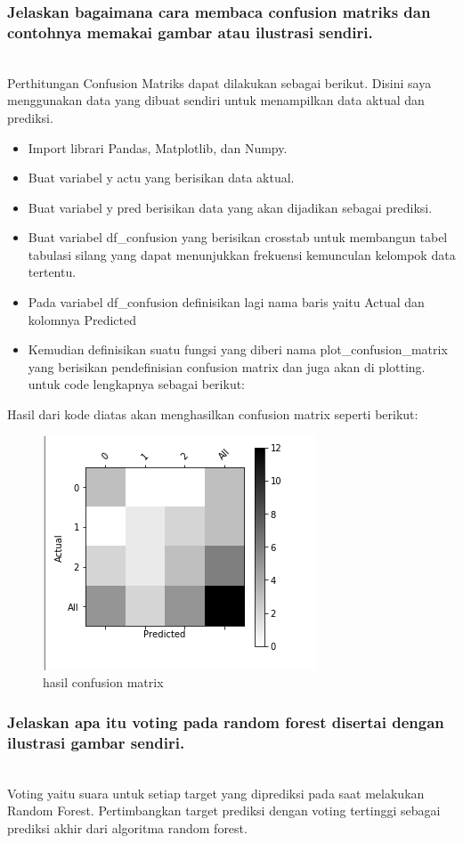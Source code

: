 \subsubsection{Jelaskan bagaimana cara membaca confusion matriks dan contohnya memakai gambar atau ilustrasi sendiri.}
\hfill\\
Perthitungan Confusion Matriks dapat dilakukan sebagai berikut. Disini saya menggunakan data yang dibuat sendiri untuk menampilkan data aktual dan prediksi.
\begin{itemize}
\item Import librari Pandas, Matplotlib, dan Numpy.
\item Buat variabel y actu yang berisikan data aktual.
\item Buat variabel y pred berisikan data yang akan dijadikan sebagai prediksi.
\item Buat variabel df\_confusion yang berisikan crosstab untuk membangun tabel tabulasi silang yang dapat menunjukkan frekuensi kemunculan kelompok data tertentu.
\item Pada variabel df\_confusion deﬁnisikan lagi nama baris yaitu Actual dan kolomnya Predicted
\item Kemudian deﬁnisikan suatu fungsi yang diberi nama plot\_confusion\_matrix yang berisikan pendeﬁnisian confusion matrix dan juga akan di plotting. untuk code lengkapnya sebagai berikut:

\end{itemize}
Hasil dari kode diatas akan menghasilkan confusion matrix seperti berikut:
\begin{figure}[H]
	\centering
	\includegraphics{figures/1174077/3/3.png}
	\caption{hasil confusion matrix}
\end{figure}

\subsubsection{Jelaskan apa itu voting pada random forest disertai dengan ilustrasi gambar sendiri.}
\hfill\\
Voting yaitu suara untuk setiap target yang diprediksi pada saat melakukan Random Forest. Pertimbangkan target prediksi dengan voting tertinggi sebagai prediksi akhir dari algoritma random forest.

